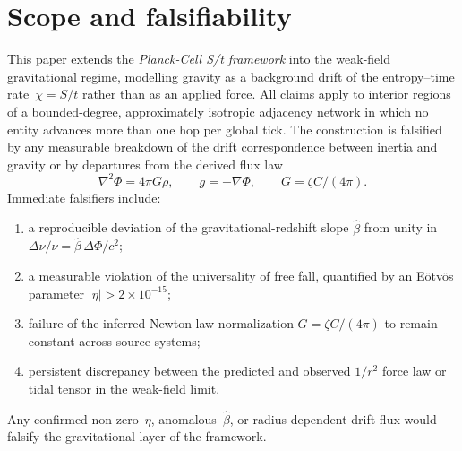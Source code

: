 \section*{Scope and falsifiability}
This paper extends the \emph{Planck-Cell S/t framework} into the weak-field
gravitational regime, modelling gravity as a background drift of the
entropy–time rate~$\chi=S/t$ rather than as an applied force.
All claims apply to interior regions of a bounded-degree, approximately
isotropic adjacency network in which no entity advances more than one hop
per global tick.  The construction is falsified by any measurable breakdown
of the drift correspondence between inertia and gravity or by departures
from the derived flux law
\[
\nabla^{2}\Phi=4\pi G\rho,\qquad g=-\nabla\Phi,\qquad G=\zeta C/(4\pi).
\]
Immediate falsifiers include:
\begin{enumerate}[label=(\roman*)]
  \item a reproducible deviation of the gravitational-redshift slope
        $\hat{\beta}$ from unity in $\Delta\nu/\nu=\hat{\beta}\,\Delta\Phi/c^{2}$;
  \item a measurable violation of the universality of free fall,
        quantified by an Eötvös parameter $|\eta|>2\times10^{-15}$;
  \item failure of the inferred Newton-law normalization
        $G=\zeta C/(4\pi)$ to remain constant across source systems;
  \item persistent discrepancy between the predicted and observed $1/r^{2}$
        force law or tidal tensor in the weak-field limit.
\end{enumerate}
Any confirmed non-zero~$\eta$, anomalous~$\hat{\beta}$, or radius-dependent
drift flux would falsify the gravitational layer of the framework.